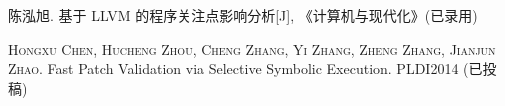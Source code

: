 \begin{publications}{99}

    \item\textsc{陈泓旭}. {基于 LLVM 的程序关注点影响分析}[J], 《计算机与现代化》(已录用)
    \item\textsc{Hongxu Chen, Hucheng Zhou, Cheng Zhang, Yi Zhang, Zheng Zhang, Jianjun Zhao}. Fast Patch Validation via Selective Symbolic Execution. PLDI2014 (已投稿)

\end{publications}
